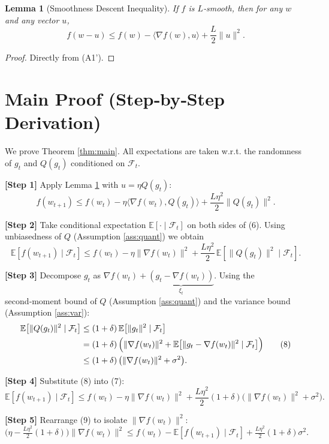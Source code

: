 \documentclass{article}
\newtheorem{lemma}{Lemma}
\begin{document}
\begin{lemma}[Smoothness Descent Inequality]\label{lem:smooth}
If $f$ is $L$‑smooth, then for any $w$ and any vector $u$,
\[
f(w-u)\le f(w)-\langle\nabla f(w),u\rangle+\frac{L}{2}\|u\|^2 .
\tag{L1}
\]
\end{lemma}
\begin{proof}
Directly from (A1'). \qedhere
\end{proof}

\section*{Main Proof (Step‑by‑Step Derivation)}
We prove Theorem \ref{thm:main}.  
All expectations are taken w.r.t. the randomness of $g_t$ and $Q(g_t)$ conditioned on $\mathcal{F}_t$.

\bigskip
\noindent\textbf{[Step 1]} Apply Lemma \ref{lem:smooth} with $u=\eta Q(g_t)$:
\[
f(w_{t+1})\le f(w_t)-\eta\langle\nabla f(w_t),Q(g_t)\rangle+\frac{L\eta^2}{2}\|Q(g_t)\|^2 .
\tag{6}
\]

\noindent\textbf{[Step 2]} Take conditional expectation $\mathbb{E}[\cdot\mid\mathcal{F}_t]$ on both sides of (6).  
Using unbiasedness of $Q$ (Assumption \ref{ass:quant}) we obtain
\[
\mathbb{E}[f(w_{t+1})\mid\mathcal{F}_t]
\le f(w_t)-\eta\|\nabla f(w_t)\|^2
      +\frac{L\eta^2}{2}\,\mathbb{E}\!\left[\|Q(g_t)\|^2\mid\mathcal{F}_t\right].
\tag{7}
\]

\noindent\textbf{[Step 3]} Decompose $g_t$ as $\nabla f(w_t)+\underbrace{(g_t-\nabla f(w_t))}_{\xi_t}$.
Using the second‑moment bound of $Q$ (Assumption \ref{ass:quant}) and the variance bound (Assumption \ref{ass:var}):
\[
\begin{aligned}
\mathbb{E}\!\left[\|Q(g_t)\|^2\mid\mathcal{F}_t\right]
&\le (1+\delta)\,\mathbb{E}\!\left[\|g_t\|^2\mid\mathcal{F}_t\right] \\
&= (1+\delta)\,\Bigl(\|\nabla f(w_t)\|^2
      +\mathbb{E}\!\left[\|g_t-\nabla f(w_t)\|^2\mid\mathcal{F}_t\right]\Bigr) \\
&\le (1+\delta)\,\bigl(\|\nabla f(w_t)\|^2+\sigma^2\bigr).
\end{aligned}
\tag{8}
\]

\noindent\textbf{[Step 4]} Substitute (8) into (7):
\[
\mathbb{E}[f(w_{t+1})\mid\mathcal{F}_t]
\le f(w_t)-\eta\|\nabla f(w_t)\|^2
   +\frac{L\eta^2}{2}(1+\delta)\bigl(\|\nabla f(w_t)\|^2+\sigma^2\bigr).
\tag{9}
\]

\noindent\textbf{[Step 5]} Rearrange (9) to isolate $\|\nabla f(w_t)\|^2$:
\[
\bigl(\eta-\tfrac{L\eta^2}{2}(1+\delta)\bigr)\|\nabla f(w_t)\|^2
\le f(w_t)-\mathbb{E}[f(w_{t+1})\mid\mathcal{F}_t]
   +\tfrac{L\eta^2}{2}(1+\delta)\sigma^2 .
\tag{10}
\]
\end{document}
